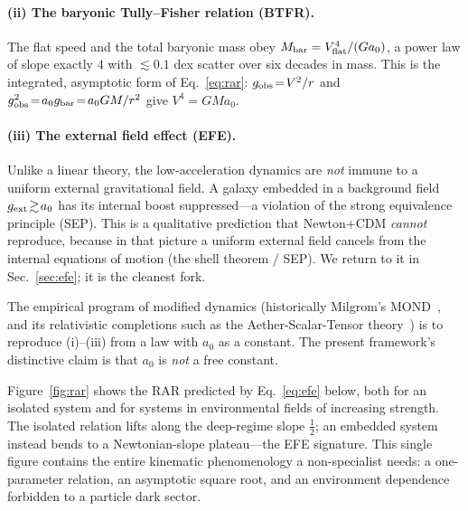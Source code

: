 \documentclass[aps,prd,twocolumn,10pt,nofootinbib,superscriptaddress]{revtex4-2}
\begin{document}
\paragraph{(ii) The baryonic Tully--Fisher relation (BTFR).} The flat speed and the total baryonic mass obey
$M_{\rm bar}=V_{\rm flat}^4/(G a_0)$, a power law of slope exactly $4$ with $\lesssim0.1$ dex scatter over six
decades in mass. This is the integrated, asymptotic form of Eq.~\eqref{eq:rar}: $g_{\rm obs}\!=\!V^2/r$ and
$g_{\rm obs}^2\!=\!a_0 g_{\rm bar}\!=\!a_0 GM/r^2$ give $V^4=GM a_0$.

\paragraph{(iii) The external field effect (EFE).} Unlike a linear theory, the low-acceleration dynamics are
\emph{not} immune to a uniform external gravitational field. A galaxy embedded in a background field
$g_{\rm ext}\!\gtrsim\!a_0$ has its internal boost suppressed---a violation of the strong equivalence principle
(SEP). This is a qualitative prediction that Newton$+$CDM \emph{cannot} reproduce, because in that picture a uniform
external field cancels from the internal equations of motion (the shell theorem / SEP). We return to it in
Sec.~\ref{sec:efe}; it is the cleanest fork.

The empirical program of modified dynamics (historically Milgrom's MOND~\cite{Milgrom1983}, and its relativistic
completions such as the Aether-Scalar-Tensor theory~\cite{Skordis2021}) is to reproduce (i)--(iii) from a law with
$a_0$ as a constant. The present framework's distinctive claim is that $a_0$ is \emph{not} a free constant.

Figure~\ref{fig:rar} shows the RAR predicted by Eq.~\eqref{eq:efe} below, both for an isolated system and for
systems in environmental fields of increasing strength. The isolated relation lifts along the deep-regime slope
$\tfrac12$; an embedded system instead bends to a Newtonian-slope plateau---the EFE signature. This single figure
contains the entire kinematic phenomenology a non-specialist needs: a one-parameter relation, an asymptotic square
root, and an environment dependence forbidden to a particle dark sector.
\end{document}
